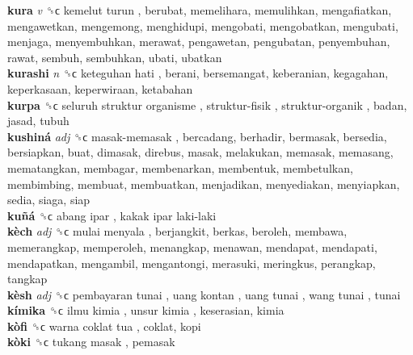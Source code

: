 \textbf{kura} \emph{v}  ␝ϲ   kemelut turun , berubat, memelihara, memulihkan, mengafiatkan, mengawetkan, mengemong, menghidupi, mengobati, mengobatkan, mengubati, menjaga, menyembuhkan, merawat, pengawetan, pengubatan, penyembuhan, rawat, sembuh, sembuhkan, ubati, ubatkan  \\
\textbf{kurashi} \emph{n}  ␝ϲ   keteguhan hati , berani, bersemangat, keberanian, kegagahan, keperkasaan, keperwiraan, ketabahan  \\
\textbf{kurpa} ␝ϲ   seluruh struktur organisme ,  struktur-fisik ,  struktur-organik , badan, jasad, tubuh  \\
\textbf{kushiná} \emph{adj}  ␝ϲ   masak-memasak , bercadang, berhadir, bermasak, bersedia, bersiapkan, buat, dimasak, direbus, masak, melakukan, memasak, memasang, mematangkan, membagar, membenarkan, membentuk, membetulkan, membimbing, membuat, membuatkan, menjadikan, menyediakan, menyiapkan, sedia, siaga, siap  \\
\textbf{kuñá} ␝ϲ   abang ipar ,  kakak ipar laki-laki   \\
\textbf{kèch} \emph{adj}  ␝ϲ   mulai menyala , berjangkit, berkas, beroleh, membawa, memerangkap, memperoleh, menangkap, menawan, mendapat, mendapati, mendapatkan, mengambil, mengantongi, merasuki, meringkus, perangkap, tangkap  \\
\textbf{kèsh} \emph{adj}  ␝ϲ   pembayaran tunai ,  uang kontan ,  uang tunai ,  wang tunai , tunai  \\
\textbf{kímika} ␝ϲ   ilmu kimia ,  unsur kimia , keserasian, kimia  \\
\textbf{kòfi} ␝ϲ   warna coklat tua , coklat, kopi  \\
\textbf{kòki} ␝ϲ   tukang masak , pemasak  \\
